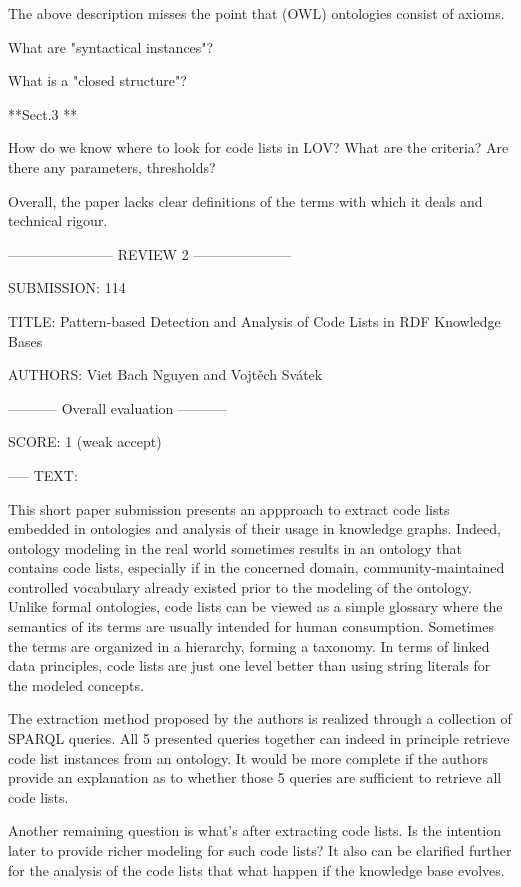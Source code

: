 The above description misses the point that (OWL) ontologies consist of axioms.

What are "syntactical instances"?

What is a "closed structure"?

**Sect.3 **

How do we know where to look for code lists in LOV? What are the criteria? Are there any parameters, thresholds?

Overall, the paper lacks clear definitions of the terms with which it deals and technical rigour.



----------------------- REVIEW 2 ---------------------

SUBMISSION: 114

TITLE: Pattern-based Detection and Analysis of Code Lists in RDF Knowledge Bases

AUTHORS: Viet Bach Nguyen and Vojtěch Svátek

----------- Overall evaluation -----------

SCORE: 1 (weak accept)

----- TEXT:

This short paper submission presents an appproach to extract code lists embedded in ontologies and analysis of their usage in knowledge graphs. Indeed, ontology modeling in the real world sometimes results in an ontology that contains code lists, especially if in the concerned domain, community-maintained controlled vocabulary already existed prior to the modeling of the ontology. Unlike formal ontologies, code lists can be viewed as a simple glossary where the semantics of its terms are usually intended for human consumption. Sometimes the terms are organized in a hierarchy, forming a taxonomy. In terms of linked data principles, code lists are just one level better than using string literals for the modeled concepts.

The extraction method proposed by the authors is realized through a collection of SPARQL queries. All 5 presented queries together can indeed in principle retrieve code list instances from an ontology. It would be more complete if the authors provide an explanation as to whether those 5 queries are sufficient to retrieve all code lists. 

Another remaining question is what's after extracting code lists. Is the intention later to provide richer modeling for such code lists? It also can be clarified further for the analysis of the code lists that what happen if the knowledge base evolves.



